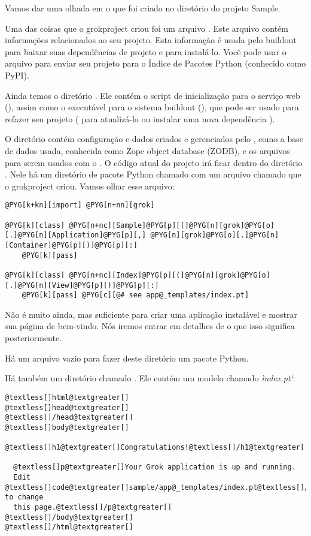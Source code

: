\documentclass[a4paper,12pt,portuguese]{manual}
\begin{document}
Vamos dar uma olhada em o que foi criado no diretório do projeto Sample.

Uma das coisas que o grokproject criou foi um arquivo .
Este arquivo contém informações relacionados ao seu projeto. Esta
informação é usada pelo buildout para baixar suas dependências de
projeto e para instalá-lo. Você pode usar o arquivo  para
enviar seu projeto para o Índice de Pacotes Python (conhecido como PyPI).

Ainda temos o diretório . Ele contém o script de inicialização
para o serviço web (), assim como o executável para o sistema
buildout (), que pode ser usado para refazer seu
projeto ( para atualizá-lo ou instalar uma nova dependência ).

O diretório  contém configuração e dados criados e gerenciados
pelo , como a base de dados usada, conhecida como Zope
object database (ZODB), e os arquivos  para serem usados com o
.
O código atual do projeto irá ficar dentro do diretório . Nele
há um diretório de pacote Python chamado  com um arquivo
chamado  que o grokproject criou. Vamos
olhar esse arquivo:

\begin{Verbatim}[commandchars=@\[\]]
@PYG[k+kn][import] @PYG[n+nn][grok]

@PYG[k][class] @PYG[n+nc][Sample]@PYG[p][(]@PYG[n][grok]@PYG[o][.]@PYG[n][Application]@PYG[p][,] @PYG[n][grok]@PYG[o][.]@PYG[n][Container]@PYG[p][)]@PYG[p][:]
    @PYG[k][pass]

@PYG[k][class] @PYG[n+nc][Index]@PYG[p][(]@PYG[n][grok]@PYG[o][.]@PYG[n][View]@PYG[p][)]@PYG[p][:]
    @PYG[k][pass] @PYG[c][@# see app@_templates/index.pt]
\end{Verbatim}

Não é muito ainda, mas suficiente para criar uma aplicação instalável
e mostrar sua página de bem-vindo. Nós iremos entrar em detalhes de o
que isso significa posteriormente.

Há um arquivo  vazio para fazer deste
diretório um pacote Python.

Há também um diretório chamado . Ele contém um modelo
chamado \emph{ìndex.pt{}`}:

\begin{Verbatim}[commandchars=@\[\]]
@textless[]html@textgreater[]
@textless[]head@textgreater[]
@textless[]/head@textgreater[]
@textless[]body@textgreater[]
  @textless[]h1@textgreater[]Congratulations!@textless[]/h1@textgreater[]

  @textless[]p@textgreater[]Your Grok application is up and running.
  Edit @textless[]code@textgreater[]sample/app@_templates/index.pt@textless[]/code@textgreater[] to change
  this page.@textless[]/p@textgreater[]
@textless[]/body@textgreater[]
@textless[]/html@textgreater[]
\end{Verbatim}
\end{document}
